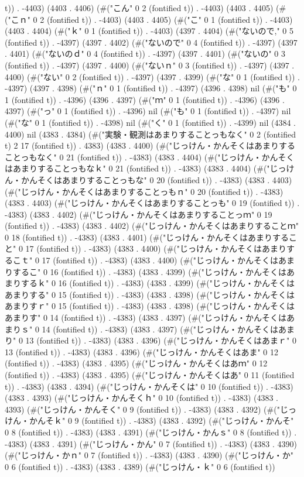 t)) . -4403) (4403 . 4406) (#("こん" 0 2 (fontified t)) . -4403) (4403 . 4405) (#("こｎ" 0 2 (fontified t)) . -4403) (4403 . 4405) (#("こ" 0 1 (fontified t)) . -4403) (4403 . 4404) (#("ｋ" 0 1 (fontified t)) . -4403) (4397 . 4404) (#("ないので," 0 5 (fontified t)) . -4397) (4397 . 4402) (#("ないので" 0 4 (fontified t)) . -4397) (4397 . 4401) (#("ないのｄ" 0 4 (fontified t)) . -4397) (4397 . 4401) (#("ないの" 0 3 (fontified t)) . -4397) (4397 . 4400) (#("ないｎ" 0 3 (fontified t)) . -4397) (4397 . 4400) (#("ない" 0 2 (fontified t)) . -4397) (4397 . 4399) (#("な" 0 1 (fontified t)) . -4397) (4397 . 4398) (#("ｎ" 0 1 (fontified t)) . -4397) (4396 . 4398) nil (#("も" 0 1 (fontified t)) . -4396) (4396 . 4397) (#("ｍ" 0 1 (fontified t)) . -4396) (4396 . 4397) (#("っ" 0 1 (fontified t)) . -4396) nil (#("も" 0 1 (fontified t)) . -4397) nil (#("な" 0 1 (fontified t)) . -4398) nil (#("く" 0 1 (fontified t)) . -4399) nil (4384 . 4400) nil (4383 . 4384) (#("実験・観測はあまりすることっもなく" 0 2 (fontified t) 2 17 (fontified t)) . 4383) (4383 . 4400) (#("じっけん・かんそくはあまりすることっもなく" 0 21 (fontified t)) . -4383) (4383 . 4404) (#("じっけん・かんそくはあまりすることっもなｋ" 0 21 (fontified t)) . -4383) (4383 . 4404) (#("じっけん・かんそくはあまりすることっもな" 0 20 (fontified t)) . -4383) (4383 . 4403) (#("じっけん・かんそくはあまりすることっもｎ" 0 20 (fontified t)) . -4383) (4383 . 4403) (#("じっけん・かんそくはあまりすることっも" 0 19 (fontified t)) . -4383) (4383 . 4402) (#("じっけん・かんそくはあまりすることっｍ" 0 19 (fontified t)) . -4383) (4383 . 4402) (#("じっけん・かんそくはあまりすることｍ" 0 18 (fontified t)) . -4383) (4383 . 4401) (#("じっけん・かんそくはあまりすること" 0 17 (fontified t)) . -4383) (4383 . 4400) (#("じっけん・かんそくはあまりするこｔ" 0 17 (fontified t)) . -4383) (4383 . 4400) (#("じっけん・かんそくはあまりするこ" 0 16 (fontified t)) . -4383) (4383 . 4399) (#("じっけん・かんそくはあまりするｋ" 0 16 (fontified t)) . -4383) (4383 . 4399) (#("じっけん・かんそくはあまりする" 0 15 (fontified t)) . -4383) (4383 . 4398) (#("じっけん・かんそくはあまりすｒ" 0 15 (fontified t)) . -4383) (4383 . 4398) (#("じっけん・かんそくはあまりす" 0 14 (fontified t)) . -4383) (4383 . 4397) (#("じっけん・かんそくはあまりｓ" 0 14 (fontified t)) . -4383) (4383 . 4397) (#("じっけん・かんそくはあまり" 0 13 (fontified t)) . -4383) (4383 . 4396) (#("じっけん・かんそくはあまｒ" 0 13 (fontified t)) . -4383) (4383 . 4396) (#("じっけん・かんそくはあま" 0 12 (fontified t)) . -4383) (4383 . 4395) (#("じっけん・かんそくはあｍ" 0 12 (fontified t)) . -4383) (4383 . 4395) (#("じっけん・かんそくはあ" 0 11 (fontified t)) . -4383) (4383 . 4394) (#("じっけん・かんそくは" 0 10 (fontified t)) . -4383) (4383 . 4393) (#("じっけん・かんそくｈ" 0 10 (fontified t)) . -4383) (4383 . 4393) (#("じっけん・かんそく" 0 9 (fontified t)) . -4383) (4383 . 4392) (#("じっけん・かんそｋ" 0 9 (fontified t)) . -4383) (4383 . 4392) (#("じっけん・かんそ" 0 8 (fontified t)) . -4383) (4383 . 4391) (#("じっけん・かんｓ" 0 8 (fontified t)) . -4383) (4383 . 4391) (#("じっけん・かん" 0 7 (fontified t)) . -4383) (4383 . 4390) (#("じっけん・かｎ" 0 7 (fontified t)) . -4383) (4383 . 4390) (#("じっけん・か" 0 6 (fontified t)) . -4383) (4383 . 4389) (#("じっけん・ｋ" 0 6 (fontified t)) 